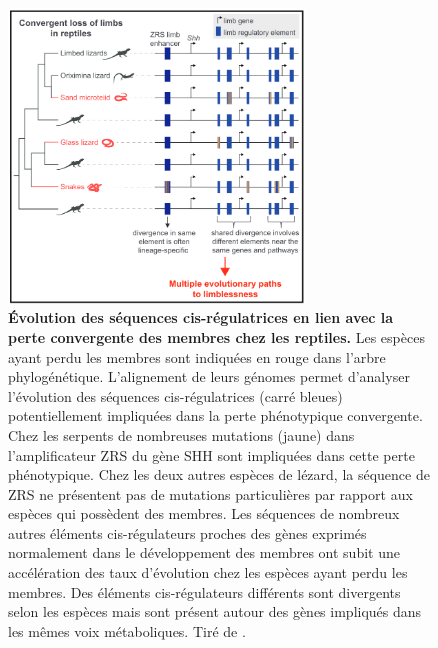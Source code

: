 \begin{figure}[H]
    \centering
    \includegraphics[width=0.7\textwidth, page=1]{figures/IPLOSS/chap4_Fig_intro.png}
    \caption[Évolution des séquences \acrshort{cis}-régulatrices en lien avec la perte convergente des membres chez les reptiles.]{
    \textbf{Évolution des séquences \acrshort{cis}-régulatrices en lien avec la perte convergente des membres chez les reptiles.} Les espèces ayant perdu les membres sont indiquées en rouge dans l'arbre phylogénétique. L'alignement de leurs génomes permet d'analyser l'évolution des séquences \acrshort{cis}-régulatrices (carré bleues) potentiellement impliquées dans la perte phénotypique convergente. Chez les serpents de nombreuses mutations (jaune) dans l'amplificateur ZRS du gène SHH sont impliquées dans cette perte phénotypique. Chez les deux autres espèces de lézard, la séquence de ZRS ne présentent pas de mutations particulières par rapport aux espèces qui possèdent des membres. Les séquences de nombreux autres éléments \acrshort{cis}-régulateurs proches des gènes exprimés normalement dans le développement des membres ont subit une accélération des taux d'évolution chez les espèces ayant perdu les membres. Des éléments \acrshort{cis}-régulateurs différents sont divergents selon les espèces mais sont présent autour des gènes impliqués dans les mêmes voix métaboliques. Tiré de \citep{roscito_convergent_2022}.
    \\
    }
    \label{fig:chap4-fig1}
\end{figure} 


